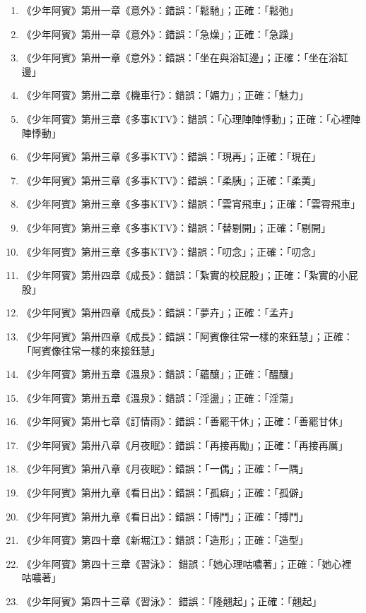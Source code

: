 \begin{enumerate}
\item 《少年阿賓》第卅一章《意外》：錯誤：「鬆馳」；正確：「鬆弛」
\item 《少年阿賓》第卅一章《意外》：錯誤：「急燥」；正確：「急躁」
\item 《少年阿賓》第卅一章《意外》：錯誤：「坐在與浴缸邊」；正確：「坐在浴缸邊」
\item 《少年阿賓》第卅二章《機車行》：錯誤：「媚力」；正確：「魅力」
\item 《少年阿賓》第卅三章《多事KTV》：錯誤：「心理陣陣悸動」；正確：「心裡陣陣悸動」
\item 《少年阿賓》第卅三章《多事KTV》：錯誤：「現再」；正確：「現在」
\item 《少年阿賓》第卅三章《多事KTV》：錯誤：「柔胰」；正確：「柔荑」
\item 《少年阿賓》第卅三章《多事KTV》：錯誤：「雲宵飛車」；正確：「雲霄飛車」
\item 《少年阿賓》第卅三章《多事KTV》：錯誤：「替剔開」；正確：「剔開」
\item 《少年阿賓》第卅三章《多事KTV》：錯誤：「叨念」；正確：「叨念」
\item 《少年阿賓》第卅四章《成長》：錯誤：「紮實的校屁股」；正確：「紮實的小屁股」
\item 《少年阿賓》第卅四章《成長》：錯誤：「夢卉」；正確：「孟卉」
\item 《少年阿賓》第卅四章《成長》：錯誤：「阿賓像往常一樣的來鈺慧」；正確：「阿賓像往常一樣的來接鈺慧」
\item 《少年阿賓》第卅五章《溫泉》：錯誤：「蘊釀」；正確：「醞釀」
\item 《少年阿賓》第卅五章《溫泉》：錯誤：「淫盪」；正確：「淫蕩」
\item 《少年阿賓》第卅七章《訂情雨》：錯誤：「善罷干休」；正確：「善罷甘休」
\item 《少年阿賓》第卅八章《月夜眠》：錯誤：「再接再勵」；正確：「再接再厲」
\item 《少年阿賓》第卅八章《月夜眠》：錯誤：「一偶」；正確：「一隅」
\item 《少年阿賓》第卅九章《看日出》：錯誤：「孤癖」；正確：「孤僻」
\item 《少年阿賓》第卅九章《看日出》：錯誤：「博鬥」；正確：「搏鬥」
\item 《少年阿賓》第四十章《新堀江》：錯誤：「造形」；正確：「造型」
\item 《少年阿賓》第四十三章《習泳》： 錯誤：「她心理咕噥著」；正確：「她心裡咕噥著」
\item 《少年阿賓》第四十三章《習泳》： 錯誤：「隆翹起」；正確：「翹起」

\end{enumerate}
